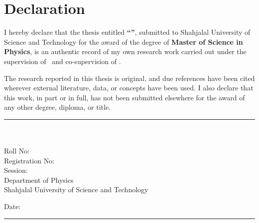 
\chapter*{Declaration}

I hereby declare that the thesis entitled \textbf{``\printtitle''}, submitted to Shahjalal University of Science and Technology for the award of the degree of \textbf{Master of Science in Physics}, is an authentic record of my own research work carried out under the supervision of \textbf{\printsupervisor}\ifx\printcosupervisor\empty\else\ and co-supervision of \textbf{\printcosupervisor}\fi.

The research reported in this thesis is original, and due references have been cited wherever external literature, data, or concepts have been used. I also declare that this work, in part or in full, has not been submitted elsewhere for the award of any other degree, diploma, or title.

\vspace{1.5in}

\begin{flushright}
    \begin{minipage}[t]{0.45\textwidth}
        \centering
        \rule{6cm}{0.4pt} \\
        \textbf{\printauthor} \\
        Roll No: \printroll \\
        Registration No: \printreg \\
        Session: \printsession \\
        Department of Physics \\
        Shahjalal University of Science and Technology
    \end{minipage}
\end{flushright}

\vspace{0.5in}
\noindent
Date: \rule{4cm}{0.4pt}
